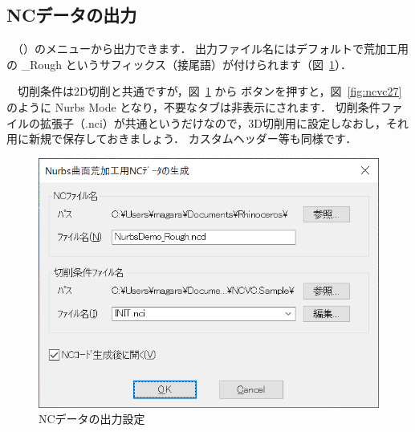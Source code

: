 \subsection{NCデータの出力}
　（）のメニューから出力できます．
出力ファイル名にはデフォルトで荒加工用の \_Rough というサフィックス（接尾語）が付けられます（図~\ref{fig:ncvc26}）．

　切削条件は2D切削と共通ですが，図~\ref{fig:ncvc26} から ボタンを押すと，図~\ref{fig:ncvc27} のように Nurbs Mode となり，不要なタブは非表示にされます．
切削条件ファイルの拡張子（.nci）が共通というだけなので，3D切削用に設定しなおし，それ用に新規で保存しておきましょう．
カスタムヘッダー等も同様です．

\begin{minipage}{0.5\textwidth}
\begin{figure}[H]
\centering
\includegraphics[scale=0.7]{No2/fig/fig26.png}
\caption{NCデータの出力設定}
\label{fig:ncvc26}
\end{figure}
\end{minipage}
